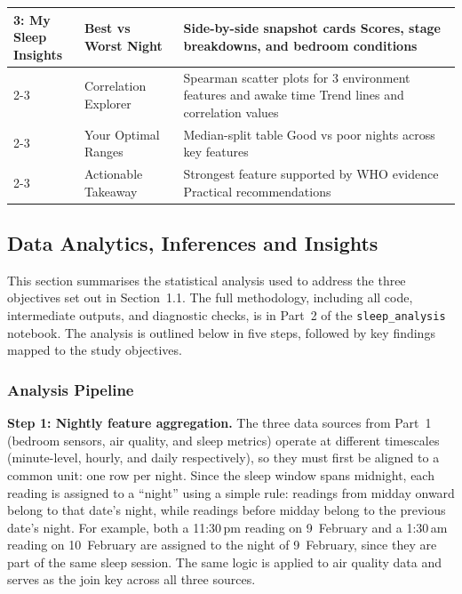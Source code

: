 \documentclass[10pt,a4paper]{extarticle}
\begin{document}
\begin{table}[H]
\begin{tabularx}{\textwidth}{p{2.2cm} p{3.2cm} X}
\midrule
\multirow{4}{*}{\parbox{2.2cm}{3: My Sleep\\Insights}} & Best vs Worst Night & \textbullet{} Side-by-side snapshot cards \textbullet{} Scores, stage breakdowns, and bedroom conditions \\
\cmidrule{2-3}
 & Correlation Explorer & \textbullet{} Spearman scatter plots for 3 environment features and awake time \textbullet{} Trend lines and correlation values \\
\cmidrule{2-3}
 & Your Optimal Ranges & \textbullet{} Median-split table \textbullet{} Good vs poor nights across key features \\
\cmidrule{2-3}
 & Actionable Takeaway & \textbullet{} Strongest feature supported by WHO evidence \textbullet{} Practical recommendations \\
\bottomrule
\end{tabularx}
\end{table}

\subsection{Data Analytics, Inferences and Insights}

This section summarises the statistical analysis used to address the three objectives set out in Section~1.1. The full methodology, including all code, intermediate outputs, and diagnostic checks, is in Part~2 of the \texttt{sleep\_analysis} notebook. The analysis is outlined below in five steps, followed by key findings mapped to the study objectives.

\subsubsection{Analysis Pipeline}

\textbf{Step 1: Nightly feature aggregation.} The three data sources from Part~1 (bedroom sensors, air quality, and sleep metrics) operate at different timescales (minute-level, hourly, and daily respectively), so they must first be aligned to a common unit: one row per night. Since the sleep window spans midnight, each reading is assigned to a ``night'' using a simple rule: readings from midday onward belong to that date's night, while readings before midday belong to the previous date's night. For example, both a 11:30\,pm reading on 9~February and a 1:30\,am reading on 10~February are assigned to the night of 9~February, since they are part of the same sleep session. The same logic is applied to air quality data and serves as the join key across all three sources.
\end{document}
